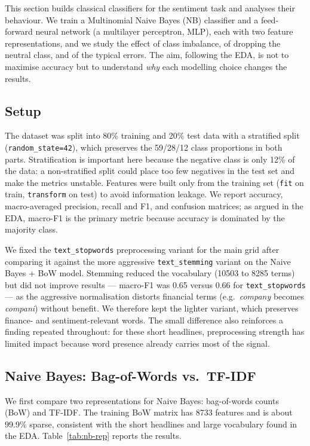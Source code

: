 \documentclass[sigconf,nonacm]{acmart}
\begin{document}
This section builds classical classifiers for the sentiment task and analyses their behaviour. We train a Multinomial Naive Bayes (NB) classifier and a feed-forward neural network (a multilayer perceptron, MLP), each with two feature representations, and we study the effect of class imbalance, of dropping the neutral class, and of the typical errors. The aim, following the EDA, is not to maximise accuracy but to understand \emph{why} each modelling choice changes the results.

\subsection{Setup}

The dataset was split into 80\% training and 20\% test data with a stratified split (\texttt{random\_state=42}), which preserves the 59/28/12 class proportions in both parts. Stratification is important here because the negative class is only 12\% of the data: a non-stratified split could place too few negatives in the test set and make the metrics unstable. Features were built only from the training set (\texttt{fit} on train, \texttt{transform} on test) to avoid information leakage. We report accuracy, macro-averaged precision, recall and F1, and confusion matrices; as argued in the EDA, macro-F1 is the primary metric because accuracy is dominated by the majority class.

We fixed the \texttt{text\_stopwords} preprocessing variant for the main grid after comparing it against the more aggressive \texttt{text\_stemming} variant on the Naive Bayes + BoW model. Stemming reduced the vocabulary (10503 to 8285 terms) but did not improve results --- macro-F1 was 0.65 versus 0.66 for \texttt{text\_stopwords} --- as the aggressive normalisation distorts financial terms (e.g.\ \textit{company} becomes \textit{compani}) without benefit. We therefore kept the lighter variant, which preserves finance- and sentiment-relevant words. The small difference also reinforces a finding repeated throughout: for these short headlines, preprocessing strength has limited impact because word presence already carries most of the signal.

\subsection{Naive Bayes: Bag-of-Words vs.\ TF-IDF}

We first compare two representations for Naive Bayes: bag-of-words counts (BoW) and TF-IDF. The training BoW matrix has 8733 features and is about 99.9\% sparse, consistent with the short headlines and large vocabulary found in the EDA. Table~\ref{tab:nb-rep} reports the results.
\end{document}
